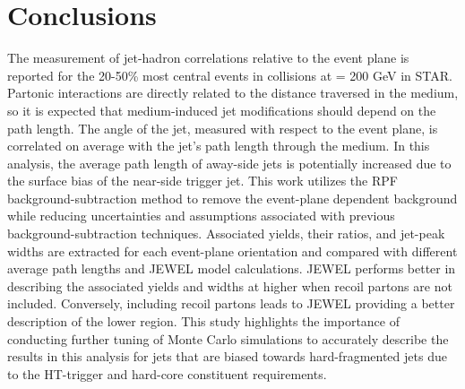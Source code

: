 \section{Conclusions} \label{sect:Summary}
The measurement of jet-hadron correlations relative to the event plane is reported for the 20-50\% most central events in \AuAu collisions at \sNN = 200 GeV in STAR. Partonic interactions are directly related to the distance traversed in the medium, so it is expected that medium-induced jet modifications should depend on the path length. The angle of the jet, measured with respect to the event plane, is correlated on average with the jet's path length through the medium. In this analysis, the average path length of away-side jets is potentially increased due to the surface bias of the near-side trigger jet. This work utilizes the RPF background-subtraction method to remove the event-plane dependent background while reducing uncertainties and assumptions associated with previous background-subtraction techniques. Associated yields, their ratios, and jet-peak widths are extracted for each event-plane orientation and compared with different average path lengths and JEWEL model calculations. JEWEL performs better in describing the associated yields and widths at higher  when recoil partons are not included. Conversely, including recoil partons leads to JEWEL providing a better description of the lower  region. This study highlights the importance of conducting further tuning of Monte Carlo simulations to accurately describe the results in this analysis for jets that are biased towards hard-fragmented jets due to the HT-trigger and hard-core constituent requirements.